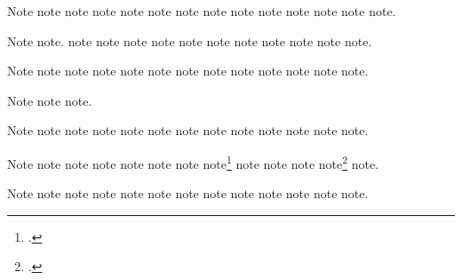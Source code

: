 \documentclass[a4paper,12pt]{report}
\begin{document}
Note\autocite{adorno:benj} note\autocite{aristotle:metaphy:gr}
note\autocite{adorno:benj} note\autocite[23]{adorno:benj}
note\autocite{ashbrook:brain}
note\autocite[3.2.996b5--8]{aristotle:metaphy:gr}
note\autocite{assocpress:gun} note\autocite{auden:reading}
note\autocite[149]{ashbrook:brain} note\autocite{author:forthcoming}
note\autocite{assocpress:gun} note\autocite{babb:peru}
note\autocite{author:forthcoming} note\autocite{auden:reading}.

Note\autocite{barcott:review} note\autocite{batson}.
note\autocite{babb:peru} note\autocite{barcott:review}
note\autocite[339]{batson} note\autocite{beattie:crime}
note\autocite{bedford:photo} note\autocite{babb:peru}
note\autocite{beethoven:sonata29} note\autocite{bernhard:boris}
note\autocite{bernstein:shostakovich} note\autocite{boxer:china}
note\autocite{beattie:crime}.

Note\autocite{brown:bremer} note\autocite{beethoven:sonata29}
note\autocite{bernstein:shostakovich} note\autocite{bernhard:boris}
note\autocite{boxer:china} note\autocite{browning:aurora}
note\autocite[pt.\ 2:55]{brown:bremer} note\autocite{bundy:macneil}
note\autocite{centinel:letters} note\autocite{chaucer:liferecords}
note\autocite{browning:aurora}
note\autocite[\printdate]{bundy:macneil}
note\autocite[29]{centinel:letters}.

Note\autocite{chaucer:alt} note\autocite{clark:mesopot}
note\autocite{chaucer:liferecords}.


Note\autocite{cleese:holygrail} note\autocite{Clemens:letter}
note\autocite{cohen:schiff} note\autocite{Clemens:letter}
note\autocite{clark:mesopot} note\autocite{cleese:holygrail}
note\autocite{cohen:schiff} note\autocite{chaucer:alt}
note\autocite{conley:fifthgrade} note\autocite{contrib:contrib}
note\autocite{conley:fifthgrade} note\autocite{contrib:contrib}
note\autocite{cook:sotweed}.

Note\autocite{cotton:manufacture:15} note\autocite{cook:sotweed}
note\autocite{creasey:ashe:blast} note\autocite{creasey:york:death}
note\autocite{cotton:manufacture:15}
note\autocite{creasey:morton:hide} note\autocite{creasey:ashe:blast}
note\footnote{.}
note\autocite{davenport:attention} note\autocite{creasey:york:death}
note\autocite{creasey:morton:hide}
note\footnote{.}
note\autocite{dinkel:agassiz}.

Note\autocite{donne:var} note\autocite{davenport:attention}
note\autocite{dunn:revolutions} note\autocite{dyna:browser}
note\autocite{dinkel:agassiz} note\autocite{eliot:pound}
note\autocite{ellet:galena} note\autocite{donne:var}
note\autocite{dyna:browser} note\autocite{emerson:nature}
note note\autocite{dunn:revolutions}
note\autocite{episode:tv}.
\end{document}
